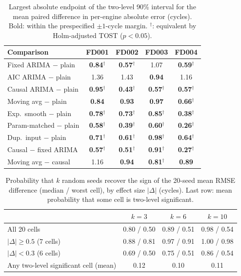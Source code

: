 \documentclass[conference]{IEEEtran}
\begin{document}
\begin{table}[t]
\centering
\caption{Largest absolute endpoint of the two-level 90\% interval for the mean paired difference in per-engine absolute error (cycles). Bold: within the prespecified $\pm1$-cycle margin. $^\dagger$: equivalent by Holm-adjusted TOST ($p<0.05$).}
\label{tab:equiv}
\footnotesize
\setlength{\tabcolsep}{2.5pt}
\begin{tabular}{lcccc}
\toprule
Comparison & FD001 & FD002 & FD003 & FD004 \\
\midrule
Fixed ARIMA $-$ plain & \textbf{0.84}$^\dagger$ & \textbf{0.57}$^\dagger$ & 1.07 & \textbf{0.59}$^\dagger$ \\
AIC ARIMA $-$ plain & 1.36 & 1.43 & \textbf{0.94} & 1.16 \\
Causal ARIMA $-$ plain & \textbf{0.95}$^\dagger$ & \textbf{0.43}$^\dagger$ & \textbf{0.57}$^\dagger$ & \textbf{0.57}$^\dagger$ \\
Moving avg $-$ plain & \textbf{0.84} & \textbf{0.93} & \textbf{0.97} & \textbf{0.66}$^\dagger$ \\
Exp.\ smooth $-$ plain & \textbf{0.78}$^\dagger$ & \textbf{0.73}$^\dagger$ & \textbf{0.85}$^\dagger$ & \textbf{0.38}$^\dagger$ \\
Param-matched $-$ plain & \textbf{0.58}$^\dagger$ & \textbf{0.39}$^\dagger$ & \textbf{0.60}$^\dagger$ & \textbf{0.26}$^\dagger$ \\
Dup.\ input $-$ plain & \textbf{0.71}$^\dagger$ & \textbf{0.61}$^\dagger$ & \textbf{0.98}$^\dagger$ & \textbf{0.64}$^\dagger$ \\
Causal $-$ fixed ARIMA & \textbf{0.57}$^\dagger$ & \textbf{0.51}$^\dagger$ & \textbf{0.91}$^\dagger$ & \textbf{0.27}$^\dagger$ \\
Moving avg $-$ causal & 1.16 & \textbf{0.94} & \textbf{0.81}$^\dagger$ & \textbf{0.89} \\
\bottomrule
\end{tabular}
\end{table}

\begin{table}[t]
\centering
\caption{Probability that $k$ random seeds recover the sign of the 20-seed mean RMSE difference (median / worst cell), by effect size $|\Delta|$ (cycles). Last row: mean probability that some cell is two-level significant.}
\label{tab:budget}
\footnotesize
\setlength{\tabcolsep}{2.5pt}
\begin{tabular}{lccc}
\toprule
 & $k{=}3$ & $k{=}6$ & $k{=}10$ \\
\midrule
All 20 cells & 0.80 / 0.50 & 0.89 / 0.51 & 0.98 / 0.54 \\
$|\Delta|\ge0.5$ (7 cells) & 0.88 / 0.81 & 0.97 / 0.91 & 1.00 / 0.98 \\
$|\Delta|<0.3$ (6 cells) & 0.69 / 0.50 & 0.75 / 0.51 & 0.86 / 0.54 \\
Any two-level significant cell (mean) & 0.12 & 0.10 & 0.11 \\
\bottomrule
\end{tabular}
\end{table}
\end{document}
